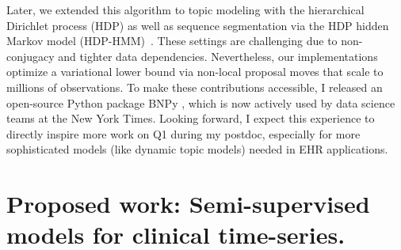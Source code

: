 \documentclass[11pt,letterpaper]{article}
\begin{document}

Later, we extended this algorithm to topic modeling with the hierarchical Dirichlet process (HDP) \citep{hughes2015hdpreliable} as well as sequence segmentation via the HDP hidden Markov model (HDP-HMM)~\citep{hughes2015hdphmm}. 
These settings are challenging due to non-conjugacy and tighter data dependencies.
Nevertheless, our implementations optimize a variational lower bound via non-local proposal moves that scale to millions of observations.
To make these contributions accessible, I released an open-source Python package BNPy \citep{hughes2017bnpy}, which is now actively used by data science teams at the New York Times.
Looking forward, I expect this experience to directly inspire 
more work on Q1 during my postdoc, especially for more sophisticated models (like dynamic topic models) needed in EHR applications.



\section{Proposed work: Semi-supervised models for clinical time-series.}
\end{document}
